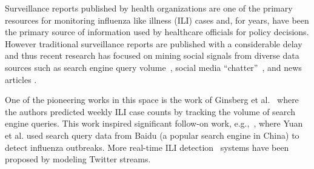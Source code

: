 Surveillance reports published by health organizations are one of the
primary resources for monitoring influenza like illness (ILI) cases and,
for years, have been the primary source of information used by healthcare
officials for policy decisions. However traditional surveillance
reports are published with a considerable delay and thus recent research
has focused on mining social signals from diverse data sources such as
search engine query volume~\cite{ref1, ref2}, social
media ``chatter''~\cite{ref3, ref4, ref5, ref6, ref7}, 
and news articles \cite{ref8}.




One of the pioneering works in this 
space is the work of
Ginsberg et al.~\cite{ref2} where the authors 
predicted weekly ILI case counts
by tracking the volume of search engine queries. This work 
inspired significant follow-on work, e.g.,~\cite{ref1}, where Yuan 
et al. used search query data from Baidu (a popular search 
engine in China) to detect influenza outbreaks. 
More real-time ILI detection~\cite{ref4} systems have been proposed 
by modeling Twitter streams.

